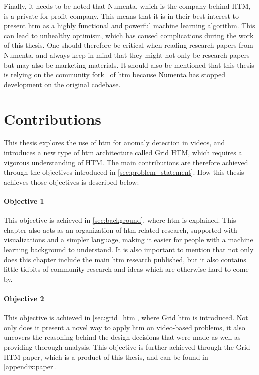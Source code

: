 \par
Finally, it needs to be noted that Numenta, which is the company behind HTM, is a private for-profit company. This means that it is in their best interest to present \gls*{htm} as a highly functional and powerful machine learning algorithm. This can lead to unhealthy optimism, which has caused complications during the work of this thesis. One should therefore be critical when reading research papers from Numenta, and always keep in mind that they might not only be research papers but may also be marketing materials. It should also be mentioned that this thesis is relying on the community fork~\cite{htm_community_fork} of \gls*{htm} because Numenta has stopped development on the original codebase.

\section{Contributions}
This thesis explores the use of \gls*{htm} for anomaly detection in videos, and introduces a new type of \gls*{htm} architecture called Grid HTM, which requires a vigorous understanding of HTM. The main contributions are therefore achieved through the objectives introduced in \autoref{sec:problem_statement}. How this thesis achieves those objectives is described below:
\paragraph*{Objective 1} \emph{}
\par
This objective is achieved in \autoref{sec:background}, where \gls*{htm} is explained. This chapter also acts as an organization of  \gls*{htm} related research, supported with visualizations and a simpler language, making it easier for people with a machine learning background to understand. It is also important to mention that not only does this chapter include the main \gls*{htm} research published, but it also contains little tidbits of community research and ideas which are otherwise hard to come by.
\paragraph*{Objective 2} \emph{}
\par
This objective is achieved in \autoref{sec:grid_htm}, where Grid \gls*{htm} is introduced. Not only does it present a novel way to apply  \gls*{htm} on video-based problems, it also uncovers the reasoning behind the design decisions that were made as well as providing thorough analysis. This objective is further achieved through the Grid HTM paper, which is a product of this thesis, and can be found in \autoref{appendix:paper}.
